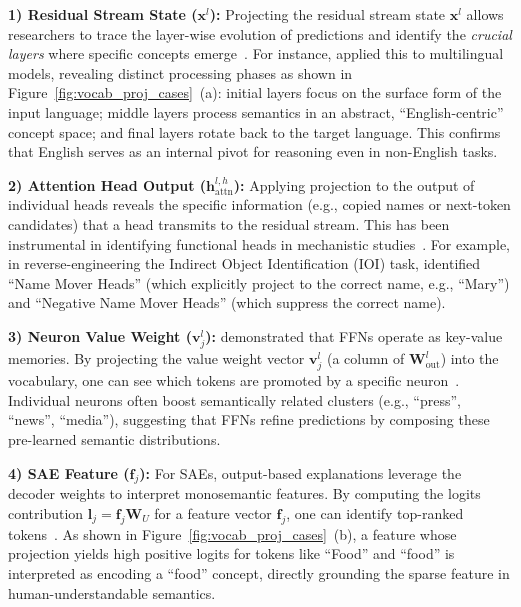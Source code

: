 \documentclass[11pt,letterpaper]{mystyle}
\begin{document}
\textbf{1) Residual Stream State ($\mathbf{x}^l$):}
Projecting the residual stream state $\mathbf{x}^l$ allows researchers to trace the layer-wise evolution of predictions and identify the \textit{crucial layers} where specific concepts emerge~\citep{belrose2023eliciting,jiang2024large,jiang2025interpretingeditingvisionlanguagerepresentations,wendler2024llamas,kargaran2025programming,phukan-etal-2024-peering,phukan-etal-2025-beyond,yugeswardeenoointerpreting}. For instance, \citet{wendler2024llamas} applied this to multilingual models, revealing distinct processing phases as shown in Figure~\ref{fig:vocab_proj_cases}~(a): initial layers focus on the surface form of the input language; middle layers process semantics in an abstract, ``English-centric'' concept space; and final layers rotate back to the target language. This confirms that English serves as an internal pivot for reasoning even in non-English tasks.

\textbf{2) Attention Head Output ($\mathbf{h}_{\text{attn}}^{l,h}$):}
Applying projection to the output of individual heads reveals the specific information (e.g., copied names or next-token candidates) that a head transmits to the residual stream. This has been instrumental in identifying functional heads in mechanistic studies~\citep{wang2023interpretability,sakarvadia2023attention,yu2024understanding,jiang2025devils,kim2025interpreting,wang2025logitlens4llms}. For example, in reverse-engineering the Indirect Object Identification (IOI) task, \citet{wang2023interpretability} identified ``Name Mover Heads'' (which explicitly project to the correct name, e.g., ``Mary'') and ``Negative Name Mover Heads'' (which suppress the correct name).

\textbf{3) Neuron Value Weight ($\mathbf{v}_{j}^l$):}
\citet{geva2021transformer} demonstrated that FFNs operate as key-value memories. By projecting the value weight vector $\mathbf{v}_{j}^l$ (a column of $\mathbf{W}_{\text{out}}^l$) into the vocabulary, one can see which tokens are promoted by a specific neuron~\citep{geva2021transformer,huo2024mmneuron,yuUnderstandingMitigatingGender2025a,shao2025benford}. Individual neurons often boost semantically related clusters (e.g., ``press'', ``news'', ``media''), suggesting that FFNs refine predictions by composing these pre-learned semantic distributions.

\textbf{4) SAE Feature ($\mathbf{f}_j$):}
For SAEs, output-based explanations leverage the decoder weights to interpret monosemantic features. By computing the logits contribution $\mathbf{l}_j = \mathbf{f}_j \mathbf{W}_U$ for a feature vector $\mathbf{f}_j$, one can identify top-ranked tokens~\citep{arad2025saes,dreyer2025attributing,muhamed2025decoding,gur2025enhancing,shu-etal-2025-survey}. As shown in Figure~\ref{fig:vocab_proj_cases}~(b), a feature whose projection yields high positive logits for tokens like ``Food'' and ``food'' is interpreted as encoding a ``food'' concept, directly grounding the sparse feature in human-understandable semantics.
\end{document}
